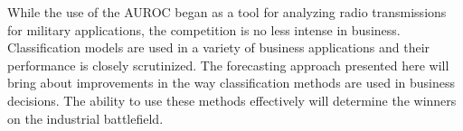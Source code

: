 While the use of the AUROC began as a tool for analyzing radio transmissions for military applications, the competition is no less intense in business.
Classification models are used in a variety of business applications and their performance is closely scrutinized.
The forecasting approach presented here will bring about improvements in the way classification methods are used in business decisions.
The ability to use these methods effectively will determine the winners on the industrial battlefield.



